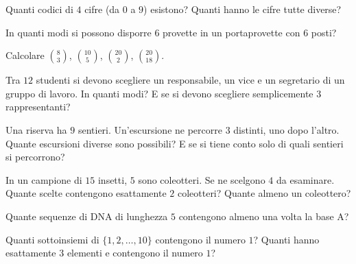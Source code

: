 \begin{esercizio}[\liv{1}]
Quanti codici di $4$ cifre (da $0$ a $9$) esistono? Quanti hanno le cifre tutte diverse?
\end{esercizio}

\begin{esercizio}[\liv{1}]
In quanti modi si possono disporre $6$ provette in un portaprovette con $6$ posti?
\end{esercizio}

\begin{esercizio}[\liv{1}]
Calcolare $\binom83$, $\binom{10}{5}$, $\binom{20}{2}$, $\binom{20}{18}$.
\end{esercizio}

\begin{esercizio}[\liv{1}]
Tra $12$ studenti si devono scegliere un responsabile, un vice e un segretario di un gruppo di lavoro. In quanti modi? E se si devono scegliere semplicemente $3$ rappresentanti?
\end{esercizio}

\begin{esercizio}[\liv{2}]
Una riserva ha $9$ sentieri. Un'escursione ne percorre $3$ distinti, uno dopo l'altro. Quante escursioni diverse sono possibili? E se si tiene conto solo di quali sentieri si percorrono?
\end{esercizio}

\begin{esercizio}[\liv{2}]
In un campione di $15$ insetti, $5$ sono coleotteri. Se ne scelgono $4$ da esaminare. Quante scelte contengono esattamente $2$ coleotteri? Quante almeno un coleottero?
\end{esercizio}

\begin{esercizio}[\liv{2}]
Quante sequenze di DNA di lunghezza $5$ contengono almeno una volta la base A?
\end{esercizio}

\begin{esercizio}[\liv{2}]
Quanti sottoinsiemi di $\{1,2,\ldots,10\}$ contengono il numero $1$? Quanti hanno esattamente $3$ elementi e contengono il numero $1$?
\end{esercizio}

